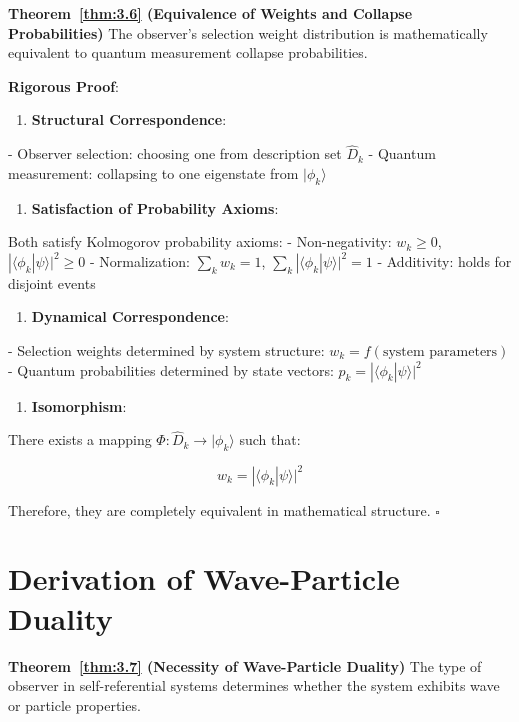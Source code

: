 \textbf{Theorem~\ref{thm:3.6} (Equivalence of Weights and Collapse Probabilities)}
\label{thm:3.6}
The observer's selection weight distribution is mathematically equivalent to quantum measurement collapse probabilities.

\textbf{Rigorous Proof}:

\begin{enumerate}
\item \textbf{Structural Correspondence}:
\end{enumerate}
   - Observer selection: choosing one from description set ${\hat{D}_k}$
   - Quantum measurement: collapsing to one eigenstate from ${|\phi_k\rangle}$
   
\begin{enumerate}
\item \textbf{Satisfaction of Probability Axioms}:
\end{enumerate}
   Both satisfy Kolmogorov probability axioms:
   - Non-negativity: $w_k \geq 0$, $|\langle\phi_k|\psi\rangle|^2 \geq 0$
   - Normalization: $\sum_k w_k = 1$, $\sum_k |\langle\phi_k|\psi\rangle|^2 = 1$
   - Additivity: holds for disjoint events
   
\begin{enumerate}
\item \textbf{Dynamical Correspondence}:
\end{enumerate}
   - Selection weights determined by system structure: $w_k = f(\text{system parameters})$
   - Quantum probabilities determined by state vectors: $p_k = |\langle\phi_k|\psi\rangle|^2$
   
\begin{enumerate}
\item \textbf{Isomorphism}:
\end{enumerate}
   There exists a mapping $\Phi: {\hat{D}_k} \to {|\phi_k\rangle}$ such that:
   
\begin{equation}
w_k = |\langle\phi_k|\psi\rangle|^2
\end{equation}

Therefore, they are completely equivalent in mathematical structure. $\square$

\section{Derivation of Wave-Particle Duality}
\label{sec:ch05_quantum:derivation-of-wave-particle-duality}

\textbf{Theorem~\ref{thm:3.7} (Necessity of Wave-Particle Duality)}
\label{thm:3.7}
The type of observer in self-referential systems determines whether the system exhibits wave or particle properties.

